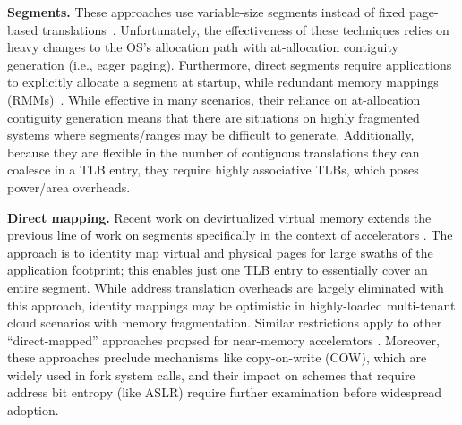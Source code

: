 \vspace{2mm}
\noindent\textbf{Segments.} These approaches use variable-size
segments instead of fixed page-based
translations~\cite{karakostas:redundant, park:hybrid,
  basu:efficient}. Unfortunately, the effectiveness of these
techniques relies on heavy changes to the OS's allocation path with
at-allocation contiguity generation (i.e., eager paging). Furthermore,
direct segments require applications to explicitly allocate a segment
at startup, while redundant memory mappings
(RMMs)~\cite{karakostas:redundant}. While effective in many scenarios,
their reliance on at-allocation contiguity generation means that there
are situations on highly fragmented systems where segments/ranges may
be difficult to generate. Additionally, because they are flexible in
the number of contiguous translations they can coalesce in a TLB
entry, they require highly associative TLBs, which poses power/area
overheads.

\vspace{2mm}
\noindent\textbf{Direct mapping.} Recent work on devirtualized
virtual memory extends the previous line of work on segments
specifically in the context of accelerators
\cite{haria:devirtualizing}. The approach is to identity map virtual
and physical pages for large swaths of the application footprint; this
enables just one TLB entry to essentially cover an entire
segment. While address translation overheads are largely eliminated
with this approach, identity mappings may be optimistic in
highly-loaded multi-tenant cloud scenarios with memory
fragmentation. Similar restrictions apply to other ``direct-mapped''
approaches propsed for near-memory accelerators
\cite{picorel:near-memory}. Moreover, these approaches preclude
mechanisms like copy-on-write (COW), which are widely used in fork
system calls, and their impact on schemes that require address bit
entropy (like ASLR) require further examination before widespread
adoption.



